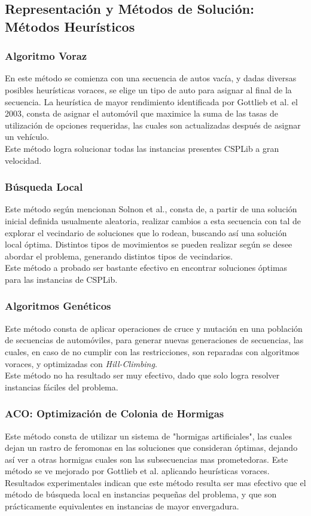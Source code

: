 \documentclass[letter, 10pt]{article}
\begin{document}
\subsection{Representación y Métodos de Solución: Métodos Heurísticos}

\subsubsection{Algoritmo Voraz}
En este método se comienza con una secuencia de autos vacía, y dadas diversas posibles heurísticas voraces, se elige un tipo de auto para asignar al final de la secuencia. La heurística de mayor rendimiento identificada por Gottlieb et al. el 2003\cite{Gottlieb_Puchta_Solnon_2003}, consta de asignar el automóvil que maximice la suma de las tasas de utilización de opciones requeridas, las cuales son actualizadas después de asignar un vehículo.\\
Este método logra solucionar todas las instancias presentes CSPLib a gran velocidad.

\subsubsection{Búsqueda Local}
Este método según mencionan Solnon et al.\cite{Solnon_Cung_Nguyen_Artigues_2008}, consta de, a partir de una solución inicial definida usualmente aleatoria, realizar cambios a esta secuencia con tal de explorar el vecindario de soluciones que lo rodean, buscando así una solución local óptima. Distintos tipos de movimientos se pueden realizar según se desee abordar el problema, generando distintos tipos de vecindarios.\\
Este método a probado ser bastante efectivo en encontrar soluciones óptimas para las instancias de CSPLib.

\subsubsection{Algoritmos Genéticos}
Este método consta de aplicar operaciones de cruce y mutación en una población de secuencias de automóviles, para generar nuevas generaciones de secuencias, las cuales, en caso de no cumplir con las restricciones, son reparadas con algoritmos voraces, y optimizadas con \textit{Hill-Climbing}.\\
Este método no ha resultado ser muy efectivo, dado que solo logra resolver instancias fáciles del problema.

\subsubsection{ACO: Optimización de Colonia de Hormigas}
Este método consta de utilizar un sistema de "hormigas artificiales", las cuales dejan un rastro de feromonas en las soluciones que consideran óptimas, dejando así ver a otras hormigas cuales son las subsecuencias mas prometedoras. Este método se ve mejorado por Gottlieb et al. aplicando heurísticas voraces.\\
Resultados experimentales indican que este método resulta ser mas efectivo que el método de búsqueda local en instancias pequeñas del problema, y que son prácticamente equivalentes en instancias de mayor envergadura.
\end{document}
